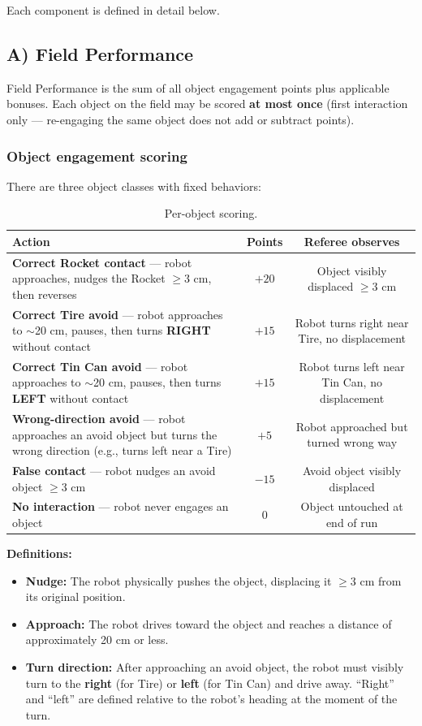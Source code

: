 \documentclass[a4]{article}
\begin{document}
Each component is defined in detail below.

\subsection*{A) Field Performance}

Field Performance is the sum of all object engagement points plus applicable bonuses. Each object on the field may be scored \textbf{at most once} (first interaction only --- re-engaging the same object does not add or subtract points).

\subsubsection*{Object engagement scoring}

There are three object classes with fixed behaviors:

\begin{table}[H]
\centering
\begin{tabular}{p{5.5cm}cc}
\toprule
\textbf{Action} & \textbf{Points} & \textbf{Referee observes} \\
\midrule
\textbf{Correct Rocket contact} --- robot approaches, nudges the Rocket $\geq$3 cm, then reverses & $+20$ & Object visibly displaced $\geq$3 cm \\
\addlinespace
\textbf{Correct Tire avoid} --- robot approaches to $\sim$20 cm, pauses, then turns \textbf{RIGHT} without contact & $+15$ & Robot turns right near Tire, no displacement \\
\addlinespace
\textbf{Correct Tin Can avoid} --- robot approaches to $\sim$20 cm, pauses, then turns \textbf{LEFT} without contact & $+15$ & Robot turns left near Tin Can, no displacement \\
\addlinespace
\textbf{Wrong-direction avoid} --- robot approaches an avoid object but turns the wrong direction (e.g., turns left near a Tire) & $+5$ & Robot approached but turned wrong way \\
\addlinespace
\textbf{False contact} --- robot nudges an avoid object $\geq$3 cm & $-15$ & Avoid object visibly displaced \\
\addlinespace
\textbf{No interaction} --- robot never engages an object & $0$ & Object untouched at end of run \\
\bottomrule
\end{tabular}
\caption{Per-object scoring.}
\end{table}

\textbf{Definitions:}
\begin{itemize}
    \item \textbf{Nudge:} The robot physically pushes the object, displacing it $\geq$3 cm from its original position.
    \item \textbf{Approach:} The robot drives toward the object and reaches a distance of approximately 20 cm or less.
    \item \textbf{Turn direction:} After approaching an avoid object, the robot must visibly turn to the \textbf{right} (for Tire) or \textbf{left} (for Tin Can) and drive away. ``Right'' and ``left'' are defined relative to the robot's heading at the moment of the turn.
\end{itemize}
\end{document}
